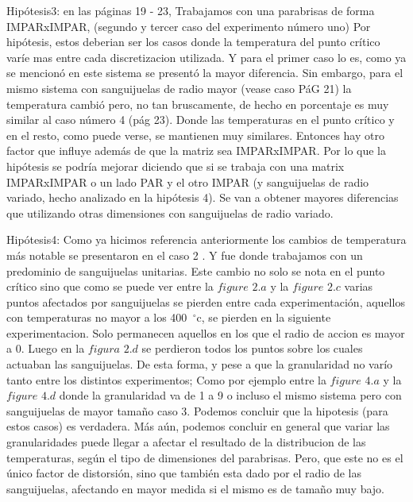 Hipótesis3: en las páginas 19 - 23, Trabajamos con una parabrisas de forma IMPARxIMPAR, (segundo y tercer caso del experimento número uno) Por hipótesis, estos deberian ser los casos donde la temperatura del punto crítico varíe mas entre cada discretizacion utilizada. Y para el primer caso lo es, como ya se mencionó en este sistema se presentó la mayor diferencia. Sin embargo, para el mismo sistema con sanguijuelas de radio mayor (vease caso PáG 21) la temperatura cambió pero, no tan bruscamente, de hecho en porcentaje es muy similar al caso número 4 (pág 23). Donde las temperaturas en el punto crítico y en el resto, como puede verse, se mantienen muy similares. Entonces hay otro factor que influye además de que la matriz sea IMPARxIMPAR. Por lo que la hipótesis se podría mejorar diciendo que si se trabaja con una matrix IMPARxIMPAR o un lado PAR y el otro IMPAR (y sanguijuelas de radio variado, hecho analizado en la hipótesis 4). Se van a obtener mayores diferencias que utilizando otras dimensiones con sanguijuelas de radio variado.\newline \newline


Hipótesis4: Como ya hicimos referencia anteriormente los cambios de temperatura más notable se presentaron en el caso 2 . Y fue donde trabajamos con un predominio de sanguijuelas unitarias. Este cambio no solo se nota en el punto crítico sino que como se puede ver entre la $figure$ $2.a$ y la $figure$ $2.c$ varias puntos afectados por sanguijuelas se pierden entre cada experimentación, aquellos con temperaturas no mayor a los 400\hspace{-1.5mm}$\phantom{a}^{\circ}$c, se pierden en la siguiente experimentacion. Solo permanecen aquellos en los que el radio de accion es mayor a 0. Luego en la $figura$ $2.d$ se perdieron todos los puntos sobre los cuales actuaban las sanguijuelas. De esta forma, y pese a que la granularidad no varío tanto entre los distintos experimentos; Como por ejemplo entre la $figure$ $4.a$ y la $figure$ $4.d$ donde la granularidad va de 1 a 9 o  incluso el mismo sistema pero  con sanguijuelas de mayor tamaño caso 3. Podemos concluir que la hipotesis (para estos casos) es verdadera. Más aún, podemos concluir en general que variar las granularidades puede llegar a afectar el resultado de la distribucion de las temperaturas, según el tipo de dimensiones del parabrisas. Pero, que este no es el único factor de distorsión, sino que también esta dado por el radio de las sanguijuelas, afectando en mayor medida si el mismo es de tamaño muy bajo.  


